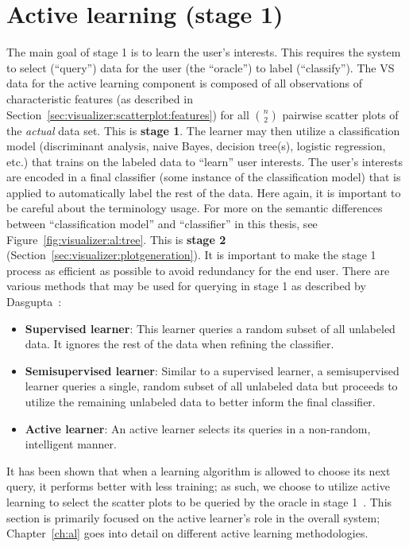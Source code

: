 \section{Active learning (stage 1)}
\label{sec:visualizer:al}

The main goal of stage 1 is to learn the user's interests. This requires the 
system to select (``query'') data for the user (the ``oracle'') to label 
(``classify''). The VS data for the active learning component is composed of 
all observations of characteristic features (as described in 
Section~\ref{sec:visualizer:scatterplot:features}) for all $n\choose2$ pairwise 
scatter plots of the \textit{actual} data set. This is \textbf{stage 1}. 
The learner may then utilize 
a classification model (discriminant analysis, naive Bayes, decision tree(s), 
logistic regression, etc.) that trains on the labeled data to ``learn'' user 
interests. The user's interests are encoded in a final classifier (some 
instance of 
the classification model) that is applied to automatically label the rest of 
the data. Here again, it is important to be careful about the terminology 
usage. For more on the semantic differences between ``classification model'' 
and ``classifier'' in this thesis, see 
Figure~\ref{fig:visualizer:al:tree}. This is 
\textbf{stage 2} (Section~\ref{sec:visualizer:plotgeneration}). 
It is important to make the stage 1 process as efficient as possible to avoid 
redundancy for the end user. There are various methods that may be used for 
querying in stage 1 as described by Dasgupta~\cite{dasgupta2011}:

\tablespacing
\begin{itemize}
	\item \textbf{Supervised learner}: This learner queries a random 
	subset of all unlabeled data. It ignores the rest of the data when refining 
	the classifier.
	\item \textbf{Semisupervised learner}: Similar to a supervised learner, a 
	semisupervised learner queries a single, random subset of all 
	unlabeled data but proceeds to utilize the remaining unlabeled data to 
	better inform the final classifier.
	\item \textbf{Active learner}: An active learner selects its queries in a 
	non-random, intelligent manner.
\end{itemize}
\bodyspacing

It has been 
shown that when a learning algorithm is allowed to choose its next query, it 
performs better with less training; as such, we choose to utilize active 
learning to select the scatter plots to be queried by the oracle in stage 
1~\cite{settles2010}. This section is primarily focused on the active learner's 
role in the overall system; Chapter~\ref{ch:al} goes into detail on different 
active learning methodologies.

